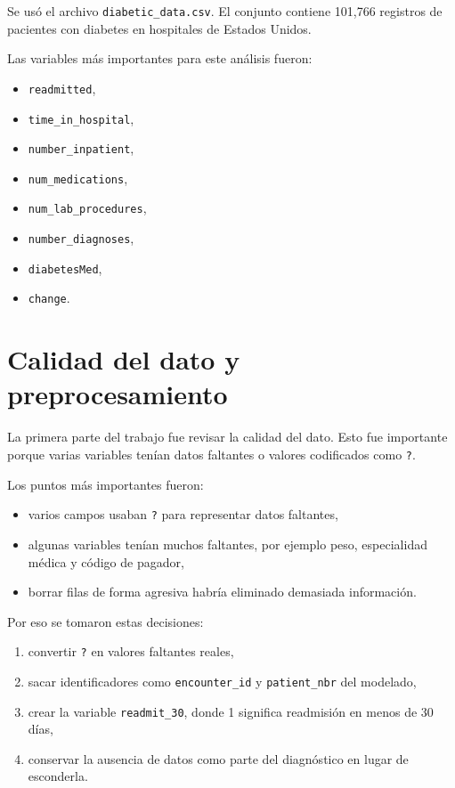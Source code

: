 \documentclass[12pt]{article}
\begin{document}
Se usó el archivo \texttt{diabetic\_data.csv}. El conjunto contiene 101,766 registros de pacientes con diabetes en hospitales de Estados Unidos.

Las variables más importantes para este análisis fueron:
\begin{itemize}[leftmargin=1.6em]
    \item \texttt{readmitted},
    \item \texttt{time\_in\_hospital},
    \item \texttt{number\_inpatient},
    \item \texttt{num\_medications},
    \item \texttt{num\_lab\_procedures},
    \item \texttt{number\_diagnoses},
    \item \texttt{diabetesMed},
    \item \texttt{change}.
\end{itemize}

\section{Calidad del dato y preprocesamiento}

La primera parte del trabajo fue revisar la calidad del dato. Esto fue importante porque varias variables tenían datos faltantes o valores codificados como \texttt{?}.

Los puntos más importantes fueron:
\begin{itemize}[leftmargin=1.6em]
    \item varios campos usaban \texttt{?} para representar datos faltantes,
\item algunas variables tenían muchos faltantes, por ejemplo peso, especialidad médica y código de pagador,
    \item borrar filas de forma agresiva habría eliminado demasiada información.
\end{itemize}

Por eso se tomaron estas decisiones:
\begin{enumerate}[leftmargin=1.6em]
    \item convertir \texttt{?} en valores faltantes reales,
    \item sacar identificadores como \texttt{encounter\_id} y \texttt{patient\_nbr} del modelado,
    \item crear la variable \texttt{readmit\_30}, donde 1 significa readmisión en menos de 30 días,
    \item conservar la ausencia de datos como parte del diagnóstico en lugar de esconderla.
\end{enumerate}
\end{document}
